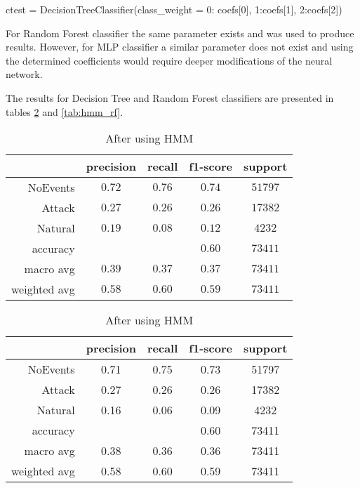 \begin{python}
ctest = DecisionTreeClassifier(class_weight = {0: coefs[0], 1:coefs[1], 2:coefs[2]})  
\end{python}

For Random Forest classifier the same parameter exists and was used to produce results. However, for MLP classifier a similar parameter does not exist and using the determined coefficients would require deeper modifications of the neural network.

The results for Decision Tree and Random Forest classifiers are presented in tables \ref{tab:hmm_dt} and \ref{tab:hmm_rf}.

\begin{table}[H]
    \centering \footnotesize
    \caption{Hidden Markov Model manipulation results for Decision Tree classifier}  \label{tab:hmm_dt}
    \begin{subtable}[t]{.5\linewidth}
        \centering
        \caption{Before using HMM} 
        \begin{tabular}{rcccc}\toprule
            & precision    &recall & f1-score  & support \\\midrule
                NoEvents  &   $  0.72 $  &  $ 0.76 $  &  $ 0.74 $  & $ 51797 $\\
                  Attack   &  $  0.27 $   & $ 0.26 $  &  $ 0.26 $  & $ 17382 $\\
                 Natural   &  $  0.19 $   & $ 0.08 $  &  $ 0.12 $  & $  4232 $\\
                accuracy   &            &          &  $0.60$  &   $73411$ \\
               macro avg   &  $  0.39 $   & $ 0.37 $  &  $ 0.37 $  & $ 73411 $\\
            weighted avg   &  $  0.58 $  &  $ 0.60 $  &  $ 0.59 $ &  $ 73411 $\\\bottomrule
        \end{tabular}
    \end{subtable}%
    \begin{subtable}[t]{.5\linewidth}
        \centering
        \caption{After using HMM}
        \begin{tabular}{rcccc}\toprule
        & precision &   recall & f1-score  & support \\\midrule

            NoEvents    &   0.71    &  0.75  &    0.73     &51797\\
            Attack     &  0.27    &  0.26  &    0.26 &   17382\\
            Natural    &   0.16  &    0.06    &  0.09  &    4232\\
        
            accuracy     &          &         &   0.60   &  73411\\
        macro avg     &  0.38    &  0.36   &   0.36  &   73411\\
        weighted avg    &   0.58    &  0.60   &   0.59  &   73411   \\ \bottomrule   
        \end{tabular}
    \end{subtable}
\end{table}


